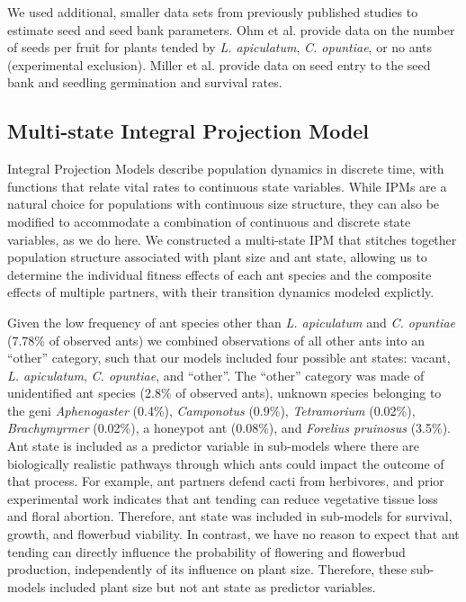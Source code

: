 \documentclass[11pt]{article}
\begin{document}
We used additional, smaller data sets from previously published studies to estimate seed and seed bank parameters. 
Ohm et al. \citep{Ohm2014} provide data on the number of seeds per fruit for plants tended by \textit{L. apiculatum}, \textit{C. opuntiae}, or no ants (experimental exclusion). 
Miller et al. \citep{Miller2009} provide data on seed entry to the seed bank and seedling germination and survival rates. 


\subsection*{Multi-state Integral Projection Model}
Integral Projection Models describe population dynamics in discrete time, with functions that relate vital rates to continuous state variables. 
While IPMs are a natural choice for populations with continuous size structure, they can also be modified to accommodate a combination of continuous and discrete state variables, as we do here. 
We constructed a multi-state IPM that stitches together population structure associated with plant size and ant state, allowing us to determine the individual fitness effects of each ant species and the composite effects of multiple partners, with their transition dynamics modeled explictly. 

Given the low frequency of ant species other than \textit{L. apiculatum} and \textit{C. opuntiae} (7.78\% of observed ants) we combined observations of all other ants into an ``other'' category, such that our models included four possible ant states: vacant, \textit{L. apiculatum}, \textit{C. opuntiae}, and ``other''. 
The ``other'' category was made of unidentified ant species (2.8\% of observed ants), unknown species belonging to the geni \textit{Aphenogaster} (0.4\%),  \textit{Camponotus} (0.9\%),  \textit{Tetramorium} (0.02\%), \textit{Brachymyrmer} (0.02\%), a honeypot ant (0.08\%), and \textit{Forelius pruinosus} (3.5\%).
Ant state is included as a predictor variable in sub-models where there are biologically realistic pathways through which ants could impact the outcome of that process. 
For example, ant partners defend cacti from herbivores, and prior experimental work indicates that ant tending can reduce vegetative tissue loss and floral abortion.
Therefore, ant state was included in sub-models for survival, growth, and flowerbud viability. 
In contrast, we have no reason to expect that ant tending can directly influence the probability of flowering and flowerbud production, independently of its influence on plant size. 
Therefore, these sub-models included plant size but not ant state as predictor variables. 
\end{document}
